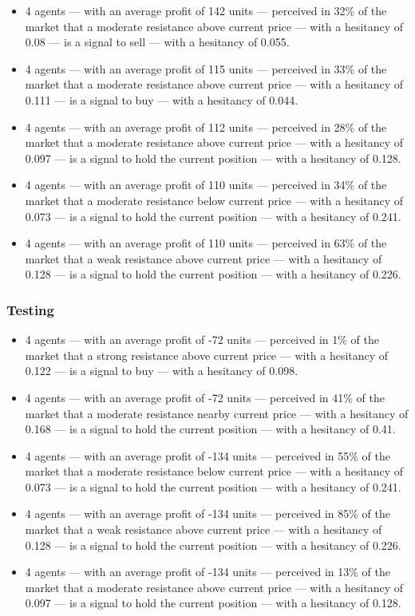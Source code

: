 {\small
  \begin{itemize}
  \item 4 agents — with an average profit of 142 units — perceived in 32\% of
    the market that a moderate resistance above current price — with a hesitancy
    of 0.08 — is a signal to sell — with a hesitancy of 0.055.
  \item 4 agents — with an average profit of 115 units — perceived in 33\% of
    the market that a moderate resistance above current price — with a hesitancy
    of 0.111 — is a signal to buy — with a hesitancy of 0.044.
  \item 4 agents — with an average profit of 112 units — perceived in 28\% of
    the market that a moderate resistance above current price — with a hesitancy
    of 0.097 — is a signal to hold the current position — with a hesitancy of
    0.128.
  \item 4 agents — with an average profit of 110 units — perceived in 34\% of
    the market that a moderate resistance below current price — with a hesitancy
    of 0.073 — is a signal to hold the current position — with a hesitancy of
    0.241.
  \item 4 agents — with an average profit of 110 units — perceived in 63\% of
    the market that a weak resistance above current price — with a hesitancy of
    0.128 — is a signal to hold the current position — with a hesitancy of
    0.226.
  \end{itemize}
}

\subsubsection{Testing}

{\small
  \begin{itemize}
  \item 4 agents — with an average profit of -72 units — perceived in 1\% of the
    market that a strong resistance above current price — with a hesitancy of
    0.122 — is a signal to buy — with a hesitancy of 0.098.
  \item 4 agents — with an average profit of -72 units — perceived in 41\% of
    the market that a moderate resistance nearby current price — with a
    hesitancy of 0.168 — is a signal to hold the current position — with a
    hesitancy of 0.41.
  \item 4 agents — with an average profit of -134 units — perceived in 55\% of
    the market that a moderate resistance below current price — with a hesitancy
    of 0.073 — is a signal to hold the current position — with a hesitancy of
    0.241.
  \item 4 agents — with an average profit of -134 units — perceived in 85\% of
    the market that a weak resistance above current price — with a hesitancy of
    0.128 — is a signal to hold the current position — with a hesitancy of
    0.226.
  \item 4 agents — with an average profit of -134 units — perceived in 13\% of
    the market that a moderate resistance above current price — with a hesitancy
    of 0.097 — is a signal to hold the current position — with a hesitancy of
    0.128.
  \end{itemize}
}

